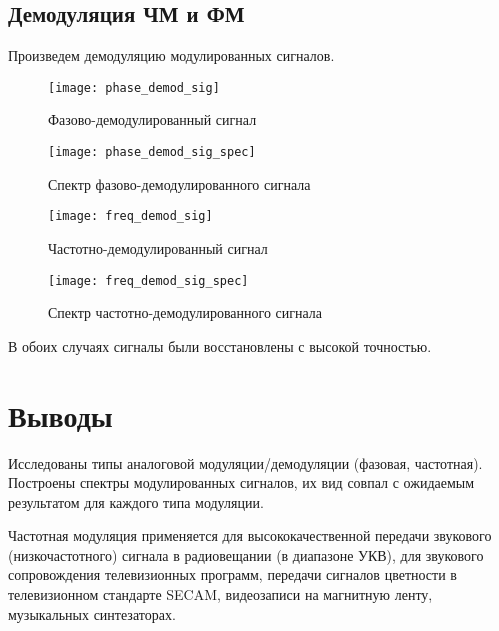 \subsection{Демодуляция ЧМ и ФМ}
Произведем демодуляцию модулированных сигналов.
\begin{figure}[H]
	\begin{center}
		\texttt{[image: phase\_demod\_sig]}
		\caption{Фазово-демодулированный сигнал} 
		\label{pic:phase_demod_sig} %
	\end{center}
\end{figure}
\begin{figure}[H]
	\begin{center}
		\texttt{[image: phase\_demod\_sig\_spec]}
		\caption{Спектр фазово-демодулированного сигнала} 
		\label{pic:phase_demod_sig_spec} %
	\end{center}
\end{figure}
\begin{figure}[H]
	\begin{center}
		\texttt{[image: freq\_demod\_sig]}
		\caption{Частотно-демодулированный сигнал} 
		\label{pic:freq_demod_sig} %
	\end{center}
\end{figure}
\begin{figure}[H]
	\begin{center}
		\texttt{[image: freq\_demod\_sig\_spec]}
		\caption{Спектр частотно-демодулированного сигнала} 
		\label{pic:freq_demod_sig_spec} %
	\end{center}
\end{figure}

В обоих случаях сигналы были восстановлены с высокой точностью.

\section{Выводы}

Исследованы типы аналоговой модуляции/демодуляции (фазовая, частотная). Построены спектры модулированных сигналов, их вид совпал с ожидаемым результатом для каждого типа модуляции.

Частотная модуляция применяется для высококачественной передачи звукового (низкочастотного) сигнала в радиовещании (в диапазоне УКВ), для звукового сопровождения телевизионных программ, передачи сигналов цветности в телевизионном стандарте SECAM, видеозаписи на магнитную ленту, музыкальных синтезаторах.

